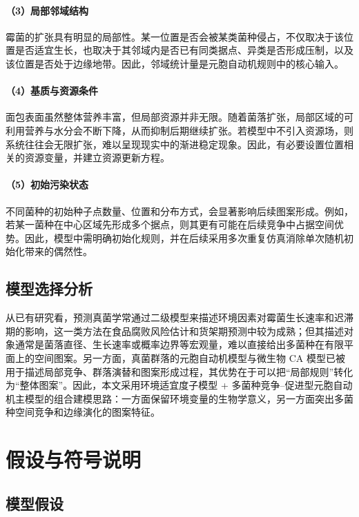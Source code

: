 \documentclass[12pt,a4paper]{ctexart}
\begin{document}
\paragraph{（3）局部邻域结构}
霉菌的扩张具有明显的局部性。某一位置是否会被某类菌种侵占，不仅取决于该位置是否适宜生长，也取决于其邻域内是否已有同类据点、异类是否形成压制，以及该位置是否处于边缘地带。因此，邻域统计量是元胞自动机规则中的核心输入。

\paragraph{（4）基质与资源条件}
面包表面虽然整体营养丰富，但局部资源并非无限。随着菌落扩张，局部区域的可利用营养与水分会不断下降，从而抑制后期继续扩张。若模型中不引入资源场，则系统往往会无限扩张，难以呈现现实中的渐进稳定现象。因此，有必要设置位置相关的资源变量，并建立资源更新方程。

\paragraph{（5）初始污染状态}
不同菌种的初始种子点数量、位置和分布方式，会显著影响后续图案形成。例如，若某一菌种在中心区域先形成多个据点，则其更有可能在后续竞争中占据空间优势。因此，模型中需明确初始化规则，并在后续采用多次重复仿真消除单次随机初始化带来的偶然性。

\subsection{模型选择分析}

从已有研究看，预测真菌学常通过二级模型来描述环境因素对霉菌生长速率和迟滞期的影响，这一类方法在食品腐败风险估计和货架期预测中较为成熟；但其描述对象通常是菌落直径、生长速率或概率边界等宏观量，难以直接给出多菌种在有限平面上的空间图案。另一方面，真菌群落的元胞自动机模型与微生物 CA 模型已被用于描述局部竞争、群落演替和图案形成过程，其优势在于可以把“局部规则”转化为“整体图案”。因此，本文采用环境适宜度子模型 + 多菌种竞争--促进型元胞自动机主模型的组合建模思路：一方面保留环境变量的生物学意义，另一方面突出多菌种空间竞争和边缘演化的图案特征。

\section{假设与符号说明}

\subsection{模型假设}
\end{document}
